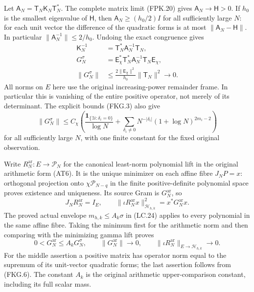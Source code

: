 Let $\mathsf A_N=\mathsf T_N\mathsf K_N\mathsf T_N^*$.
The complete matrix limit (FPK.20) gives
$\mathsf A_N\to\mathsf H>0$. If $h_0$ is the smallest eigenvalue
of $\mathsf H$, then $\mathsf A_N\geq(h_0/2)I$ for all sufficiently
large $N$: for each unit vector the difference of the quadratic forms
is at most $\|\mathsf A_N-\mathsf H\|$. In particular
$\|\mathsf A_N^{-1}\|\leq2/h_0$. Undoing the exact congruence gives
\[
 \begin{aligned}
 \mathsf K_N^{-1}&=\mathsf T_N^*\mathsf A_N^{-1}\mathsf T_N,\\
 G_N^\sigma&=\mathsf E_\chi^*\mathsf T_N^*
                      \mathsf A_N^{-1}\mathsf T_N\mathsf E_\chi,\\
 \|G_N^\sigma\|&\leq\frac{2\|\mathsf E_\chi\|^2}{h_0}
                         \|\mathsf T_N\|^2\longrightarrow0.
 \end{aligned}
 \tag{FKG.4}
\]
All norms on $E$ here use the original increasing-power remainder
frame. In particular this is vanishing of the entire positive operator,
not merely of its determinant. The explicit bounds (FKG.3) also give
\[
 \|G_N^\sigma\|\leq C_\chi\left(
 \frac{\mathbf1_{\{\exists i:\delta_i=0\}}}{\log N}
 +\sum_{\delta_i\ne0}N^{-|\delta_i|}
                      (1+\log N)^{2m_i-2}\right)
 \tag{FKG.5}
\]
for all sufficiently large $N$, with one finite constant for the
fixed original observation.

Write $R_N^{\mathrm{ar}}:E\to\mathcal P_N$ for the canonical
least-norm polynomial lift in the original arithmetic form (AT6).
It is the unique minimizer on each affine fibre $J_NP=x$:
orthogonal projection onto $\chi\mathcal P_{N-q}$ in the finite
positive-definite polynomial space proves existence and uniqueness.
Its source Gram is $G_N^{\mathrm{ar}}$, so
\[
 J_NR_N^{\mathrm{ar}}=I_E,\qquad
 \|\iota R_N^{\mathrm{ar}}x\|_{\mathscr H_{h,k}}^2
                     =x^*G_N^{\mathrm{ar}}x.
 \tag{FKG.6}
\]
The proved actual envelope $m_{h,k}\leq A_k\sigma$ in (LC.24)
applies to every polynomial in the same affine fibre. Taking the
minimum first for the arithmetic norm and then comparing with the
minimizing gamma lift proves
\[
 0<G_N^{\mathrm{ar}}\leq A_kG_N^\sigma,\qquad
 \|G_N^{\mathrm{ar}}\|\to0,\qquad
 \|\iota R_N^{\mathrm{ar}}\|_{E\to\mathscr H_{h,k}}\to0.
 \tag{FKG.7}
\]
For the middle assertion a positive matrix has operator norm equal
to the supremum of its unit-vector quadratic forms; the last assertion
follows from (FKG.6). The constant $A_k$ is the original arithmetic
upper-comparison constant, including its full scalar mass.

